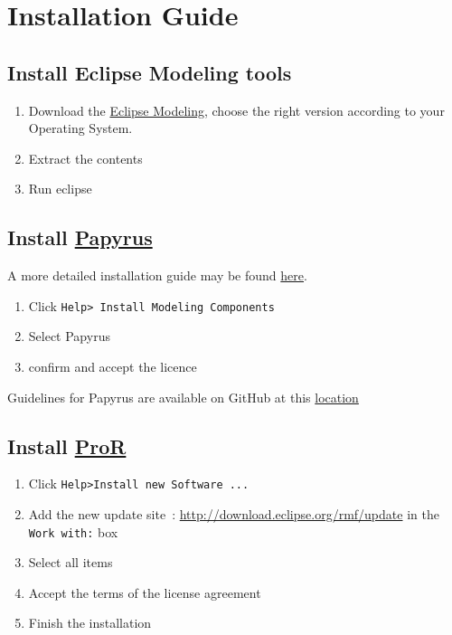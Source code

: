 \documentclass{openetcs_report}
\begin{document}

\section{Installation Guide}
\subsection{Install Eclipse Modeling tools}
\begin{enumerate}
\item Download the
  \href{http://www.eclipse.org/downloads/packages/eclipse-modeling-tools/keplerr}{Eclipse
    Modeling}, choose the right version according to your Operating System.
\item Extract the contents 
\item Run eclipse
\end{enumerate}


 \subsection{Install \href{http://www.eclipse.org/papyrus/}{Papyrus}}
A more detailed installation guide may be found
\href{https://github.com/openETCS/toolchain/blob/master/ToolDescription/Papyrus/HowTo_install_papyrus_V1.2.0.pdf}{here}.
\begin{enumerate}
\item Click \verb+Help> Install Modeling Components+
\item Select Papyrus
\item confirm and accept the licence
\end{enumerate}


Guidelines for Papyrus are available on GitHub at this
\href{https://github.com/openETCS/model-evaluation/tree/master/model/Papyrus-CEA-All4tec/papyrus_guidelines}{location}

\subsection{Install \href{http://www.eclipse.org/rmf/pror/}{ProR}}
\begin{enumerate}
\item Click \verb+Help>Install new Software ...+
\item Add the new update site~:
\url{http://download.eclipse.org/rmf/update} 
in the \verb+Work with:+ box
\item Select all items
\item Accept the terms of the license agreement
\item Finish the installation
\end{enumerate}
\end{document}
